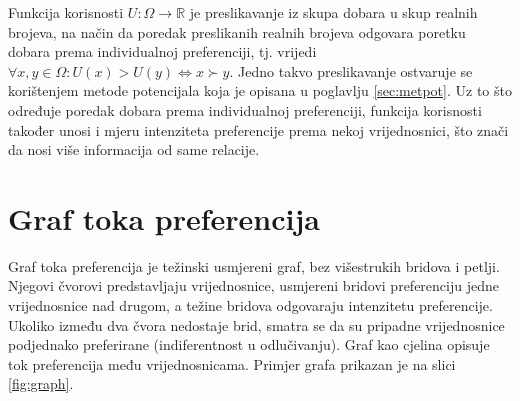 \documentclass[lmodern, utf8, diplomski, numeric]{fer}
\begin{document}
  Funkcija korisnosti  $U\colon \Omega \to \mathbb{R}$ je preslikavanje iz skupa dobara u skup realnih brojeva, na način da poredak preslikanih realnih brojeva odgovara poretku dobara prema individualnoj preferenciji, tj. vrijedi $\forall x, y \in \Omega \colon U(x) > U(y) \Leftrightarrow x \succ y$.
  Jedno takvo preslikavanje ostvaruje se korištenjem metode potencijala koja je opisana u poglavlju \ref{sec:metpot}.
  Uz to što određuje poredak dobara prema individualnoj preferenciji, funkcija korisnosti također unosi i mjeru intenziteta preferencije prema nekoj vrijednosnici, što znači da nosi više informacija od same relacije.

  \section{Graf toka preferencija}
  
  Graf toka preferencija je težinski usmjereni graf, bez višestrukih bridova i petlji.
  Njegovi čvorovi predstavljaju vrijednosnice, usmjereni bridovi preferenciju jedne vrijednosnice nad drugom, a težine bridova odgovaraju intenzitetu preferencije.
  Ukoliko između dva čvora nedostaje brid, smatra se da su pripadne vrijednosnice podjednako preferirane (indiferentnost u odlučivanju).
  Graf kao cjelina opisuje tok preferencija među vrijednosnicama.
  Primjer grafa prikazan je na slici \ref{fig:graph}.
  
\end{document}
